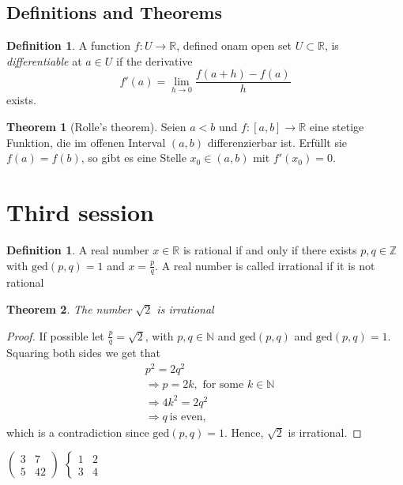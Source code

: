 \documentclass{article} %
\newtheorem{theorem}{Theorem}
\theoremstyle{definition}
\newtheorem{definition}[theorem]{Definition}
\newtheorem{theosec}{Theorem}[section]
\theoremstyle{definition}
\newtheorem{defsec}{Definition}[section]
\begin{document}
\subsection{Definitions and Theorems}
\begin{defsec}
    A function $f:U \rightarrow \mathbb{R}$, defined onam open set $U \subset \mathbb{R}$, is \textit{differentiable} at $a \in U$ if the derivative \[ f'(a) = \lim_{h \to 0}\frac{f(a+h)-f(a)}{h} \] exists.
\end{defsec}
\begin{theosec}[Rolle's theorem]
    Seien $a<b$ und $f:[a,b] \rightarrow \mathbb{R}$ eine stetige Funktion, die im offenen Interval $(a,b)$ differenzierbar ist. Erfüllt sie $f(a)=f(b)$, so gibt es eine Stelle $x_0 \in (a,b)$ mit $f'(x_0)=0$.
\end{theosec}
\section{Third session}

\begin{definition}
    A real number $x \in \mathbb{R}$ is rational if and only if there exists $p,q \in \mathbb{Z}$ with $\text{ged}(p,q)=1$ and $x = \frac{p}{q}$. A real number is called irrational if it is not rational
\end{definition}

\begin{theorem}
    The number $\sqrt{2}$ is irrational
\end{theorem}

\begin{proof}
    If possible let $\frac{p}{q} = \sqrt{2}$, with $p,q \in \mathbb{N}$ and $\text{ged}(p,q)$ and $\text{ged}(p,q)=1$. Squaring both sides we get that \
    \begin{align}
        &p^2 = 2q^2 \nonumber \\
        &\Rightarrow p = 2k, \text{ for some $k \in \mathbb{N}$} \nonumber \\
        &\Rightarrow 4k^2 = 2q^2 \nonumber \\
        &\Rightarrow q \ \text{is even,}
    \end{align}   
which is a contradiction since $\text{ged}(p,q)=1$. Hence, $\sqrt{2}$ is irrational.
\end{proof}

\newcommand{\mat}[4]{\begin{pmatrix} #1 & #2 \\ #3 & #4 \end{pmatrix}}
$\mat{3}{7}{5}{42}$
\newcommand{\case}[4]{\begin{cases} #1 & #2 \\ #3 & #4 \end{cases}}
$\case{1}{2}{3}{4}$
\end{document}
